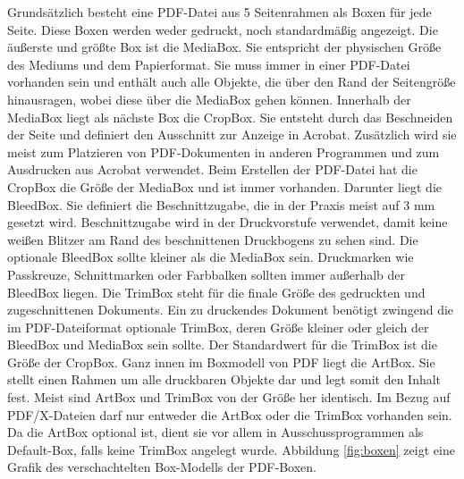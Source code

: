 \par
Grundsätzlich besteht eine PDF-Datei aus 5 Seitenrahmen als Boxen für jede Seite. Diese Boxen werden weder gedruckt, noch standardmäßig angezeigt. Die äußerste und größte Box ist die MediaBox. Sie entspricht der physischen Größe des Mediums und dem Papierformat. Sie muss immer in einer PDF-Datei vorhanden sein und enthält auch alle Objekte, die über den Rand der Seitengröße hinausragen, wobei diese über die MediaBox gehen können. Innerhalb der MediaBox liegt als nächste Box die CropBox. Sie entsteht durch das Beschneiden der Seite und definiert den Ausschnitt zur Anzeige in Acrobat. Zusätzlich wird sie meist zum Platzieren von PDF-Dokumenten in anderen Programmen und zum Ausdrucken aus Acrobat verwendet. Beim Erstellen der PDF-Datei hat die CropBox die Größe der MediaBox und ist immer vorhanden. Darunter liegt die BleedBox. Sie definiert die Beschnittzugabe, die in der Praxis meist auf 3 mm gesetzt wird. Beschnittzugabe wird in der Druckvorstufe verwendet, damit keine weißen Blitzer am Rand des beschnittenen Druckbogens zu sehen sind. Die optionale BleedBox sollte kleiner als die MediaBox sein. Druckmarken wie Passkreuze, Schnittmarken oder Farbbalken sollten immer außerhalb der BleedBox liegen. Die TrimBox steht für die finale Größe des gedruckten und zugeschnittenen Dokuments. Ein zu druckendes Dokument benötigt zwingend die im PDF-Dateiformat optionale TrimBox, deren Größe kleiner oder gleich der BleedBox und MediaBox sein sollte. Der Standardwert für die TrimBox ist die Größe der CropBox. Ganz innen im Boxmodell von PDF liegt die ArtBox. Sie stellt einen Rahmen um alle druckbaren Objekte dar und legt somit den Inhalt fest. Meist sind ArtBox und TrimBox von der Größe her identisch. Im Bezug auf PDF/X-Dateien darf nur entweder die ArtBox oder die TrimBox vorhanden sein. Da die ArtBox optional ist, dient sie vor allem in Ausschussprogrammen als Default-Box, falls keine TrimBox angelegt wurde. Abbildung \ref{fig:boxen} zeigt eine Grafik des verschachtelten Box-Modells der PDF-Boxen.
\par
